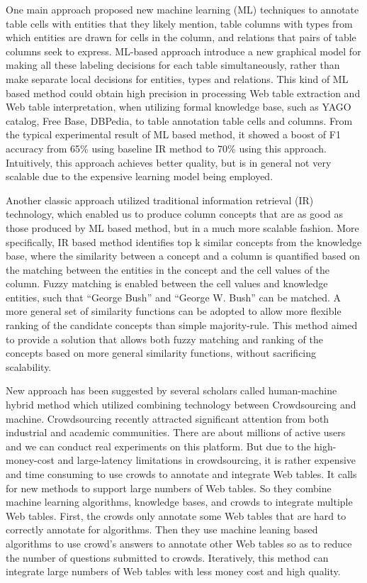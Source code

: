 \documentclass{article} %
\begin{document}
One main approach proposed new machine learning (ML) techniques to annotate table cells with entities that they likely mention, table columns with types from which entities are drawn for cells in the column, and relations that pairs of table columns seek to express. ML-based approach introduce a new graphical model for making all these labeling decisions for each table simultaneously, rather than make separate local decisions for entities, types and relations. This kind of ML based method could obtain high precision in processing Web table extraction and Web table interpretation, when utilizing formal knowledge base, such as YAGO catalog, Free Base, DBPedia, to table annotation table cells and columns. From the typical experimental result of ML based method, it showed a boost of F1 accuracy from 65\% using baseline IR method to 70\% using this approach. Intuitively, this approach achieves better quality, but is in general not very scalable due to the expensive learning model being employed.

Another classic approach utilized traditional information retrieval (IR) technology, which enabled us to produce column concepts that are as good as those produced by ML based method, but in a much more scalable fashion. More specifically, IR based method identifies top k similar concepts from the knowledge base, where the similarity between a concept and a column is quantified based on the matching between the entities in the concept and the cell values of the column. Fuzzy matching is enabled between the cell values and knowledge entities, such that “George Bush” and “George W. Bush” can be matched. A more general set of similarity functions can be adopted to allow more flexible ranking of the candidate concepts than simple majority-rule. This method aimed to provide a solution that allows both fuzzy matching and ranking of the concepts based on more general similarity functions, without sacrificing scalability.

New approach has been suggested by several scholars called human-machine hybrid method which utilized combining technology between Crowdsourcing and machine. Crowdsourcing recently attracted significant attention from both industrial and academic communities. There are about millions of active users and we can conduct real experiments on this platform. But due to the high-money-cost and large-latency limitations in crowdsourcing, it is rather expensive and time consuming to use crowds to annotate and integrate Web tables. It calls for new methods to support large numbers of Web tables. So they combine machine learning algorithms, knowledge bases, and crowds to integrate multiple Web tables. First, the crowds only annotate some Web tables that are hard to correctly annotate for algorithms. Then they use machine leaning based algorithms to use crowd’s answers to annotate other Web tables so as to reduce the number of questions submitted to crowds. Iteratively, this method can integrate large numbers of Web tables with less money cost and high quality.
\end{document}
